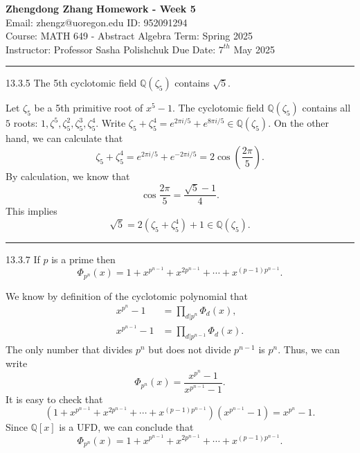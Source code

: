 \documentclass[a4paper, 12pt]{article}
\begin{document}
\noindent

\large\textbf{Zhengdong Zhang} \hfill \textbf{Homework - Week 5} \\
Email: zhengz@uoregon.edu \hfill ID: 952091294 \\
\normalsize Course: MATH 649 - Abstract Algebra \hfill Term: Spring 2025 \\
Instructor: Professor Sasha Polishchuk \hfill Due Date: $7^{th}$ May 2025 \\
\noindent\rule{7in}{2.8pt}

\begin{problem}{13.3.5}
The 5th cyclotomic field \(\mathbb{Q}(\zeta_5)\) contains \(\sqrt{5}\). 
\end{problem}
\begin{solution}
Let \(\zeta_5\) be a 5th primitive root of \(x^5-1\). The cyclotomic field \(\mathbb{Q}(\zeta_5)\) contains all \(5\) roots: \(1,\zeta^5,\zeta_5^2,\zeta_5^3,\zeta_5^4\). Write \(\zeta_5+\zeta_5^4=e^{2\pi i/5}+e^{8\pi i/5}\in \mathbb{Q}(\zeta_5)\). On the other hand, we can calculate that 
\[\zeta_5+\zeta_5^4=e^{2\pi i/5}+e^{-2\pi i/5}=2\cos (\frac{2\pi }{5}).\]
By calculation, we know that 
\[\cos \frac{2\pi}{5}=\frac{\sqrt{5}-1}{4}.\]
This implies 
\[\sqrt{5}=2(\zeta_5+\zeta_5^4)+1\in \mathbb{Q}(\zeta_5).\]
\end{solution}

\noindent\rule{7in}{2.8pt}
\begin{problem}{13.3.7}
If \(p\) is a prime then 
\[\Phi_{p^n}(x)=1+x^{p^{n-1}}+x^{2p^{n-1}}+\cdots+x^{(p-1)p^{n-1}}.\]
\end{problem}
\begin{solution}
We know by definition of the cyclotomic polynomial that 
\begin{align*}
    x^{p^n}-1&=\prod_{d|p^n}\Phi_d(x),\\
    x^{p^{n-1}}-1&=\prod_{d|p^{n-1}}\Phi_d(x).
\end{align*}
The only number that divides \(p^n\) but does not divide \(p^{n-1}\) is \(p^n\). Thus, we can write 
\[\Phi_{p^n}(x)=\frac{x^{p^n}-1}{x^{p^{n-1}}-1}.\]
It is easy to check that 
\[(1+x^{p^{n-1}}+x^{2p^{n-1}}+\cdots+x^{(p-1)p^{n-1}})(x^{p^{n-1}}-1)=x^{p^n}-1.\]
Since \(\mathbb{Q}[x]\) is a UFD, we can conclude that 
\[\Phi_{p^n}(x)=1+x^{p^{n-1}}+x^{2p^{n-1}}+\cdots+x^{(p-1)p^{n-1}}.\]
\end{solution}
\end{document}
